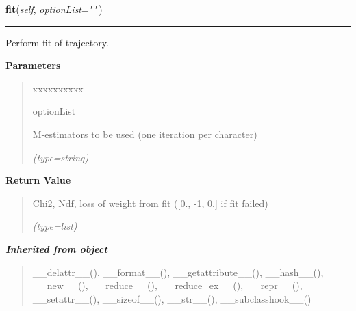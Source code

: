 \hspace{.8\funcindent}\begin{boxedminipage}{\funcwidth}

    \raggedright \textbf{fit}(\textit{self}, \textit{optionList}={\tt \texttt{'}\texttt{}\texttt{'}})

    \vspace{-1.5ex}

    \rule{\textwidth}{0.5\fboxrule}
\setlength{\parskip}{2ex}
    Perform fit of trajectory.

\setlength{\parskip}{1ex}
      \textbf{Parameters}
      \vspace{-1ex}

      \begin{quote}
        \begin{Ventry}{xxxxxxxxxx}

          \item[optionList]

          M-estimators to be used (one iteration per character)

            {\it (type=string)}

        \end{Ventry}

      \end{quote}

      \textbf{Return Value}
    \vspace{-1ex}

      \begin{quote}
      Chi2, Ndf, loss of weight from fit ([0., -1, 0.] if fit failed)

      {\it (type=list)}

      \end{quote}

    \end{boxedminipage}


\large{\textbf{\textit{Inherited from object}}}

\begin{quote}
\_\_delattr\_\_(), \_\_format\_\_(), \_\_getattribute\_\_(), \_\_hash\_\_(), \_\_new\_\_(), \_\_reduce\_\_(), \_\_reduce\_ex\_\_(), \_\_repr\_\_(), \_\_setattr\_\_(), \_\_sizeof\_\_(), \_\_str\_\_(), \_\_subclasshook\_\_()
\end{quote}


